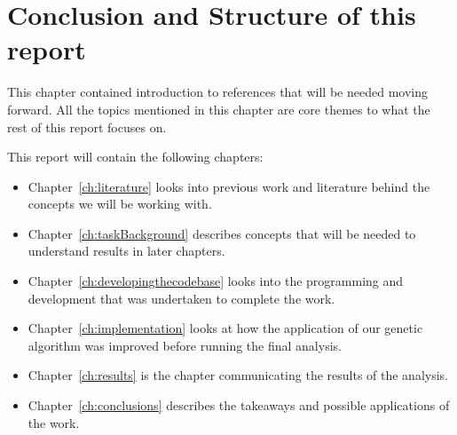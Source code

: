 \section{Conclusion and Structure of this report}
This chapter contained introduction to references that will be needed moving forward. 
All the topics mentioned in this chapter are core themes to what the rest of this report focuses on.

This report will contain the following chapters:
\begin{itemize}
    \item Chapter~\ref{ch:literature} looks into previous work and literature behind the concepts we will be working with.
    \item Chapter~\ref{ch:taskBackground} describes concepts that will be needed to understand results in later chapters.
    \item Chapter~\ref{ch:developingthecodebase} looks into the programming and development that was undertaken to complete the work.
    \item Chapter~\ref{ch:implementation} looks at how the application of our genetic algorithm was improved before running the final analysis.
    \item Chapter~\ref{ch:results} is the chapter communicating the results of the analysis.
    \item Chapter~\ref{ch:conclusions} describes the takeaways and possible applications of the work.
\end{itemize}